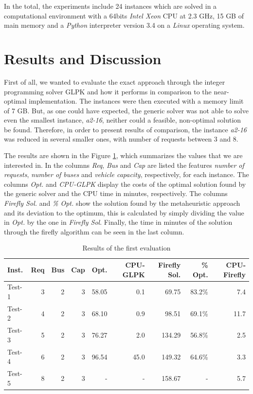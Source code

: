 \documentclass[tuberlin,cic,tc,openright,english,noabntcite,oneside]{iiufrgs}
\begin{document}
In the total, the experiments include 24 instances which are solved in a computational environment with a 64bits \emph{Intel Xeon} CPU at 2.3 GHz, 15 GB of main memory and a \emph{Python} interpreter version 3.4 on a \emph{Linux} operating system.

\section{Results and Discussion}
First of all, we wanted to evaluate the exact approach through the integer programming solver GLPK and how it performs in comparison to the near-optimal implementation. The instances were then executed with a memory limit of 7 GB. But, as one could have expected, the generic solver was not able to solve even the smallest instance, \emph{a2-16}, neither could a feasible, non-optimal solution be found. Therefore, in order to present results of comparison, the instance \emph{a2-16} was reduced in several smaller ones, with number of requests between 3 and 8.

The results are shown in the Figure \ref{tab:evaluation-1}, which summarizes the values that we are interested in. In the columns \emph{Req}, \emph{Bus} and \emph{Cap} are listed the features \emph{number of requests}, \emph{number of buses} and \emph{vehicle capacity}, respectively, for each instance. The columns \emph{Opt.} and \emph{CPU-GLPK} display the costs of the optimal solution found by the generic solver and the CPU time in minutes, respectively. The columns \emph{Firefly Sol.} and \emph{\% Opt.} show the solution found by the metaheuristic approach and its deviation to the optimum, this is calculated by simply dividing the value in \emph{Opt.} by the one in \emph{Firefly Sol}. Finally, the time in minutes of the solution through the firefly algorithm can be seen in the last column.
\begin{table}[H]
\centering
\caption{Results of the first evaluation}
\begin{tabular}{l | r | r | r | r | r | r | r | r}
\hline
Inst. & Req & Bus & Cap & Opt. & CPU-GLPK & Firefly Sol. & \% Opt. & CPU-Firefly\\
\hline
Test-1 & 	3 & 	2 & 	3 & 	58.05 & 	0.1 & 	69.75 & 	83.2\% & 	7.4 \\
Test-2 & 	4 & 	2 & 	3 & 	68.10 & 	0.9 & 	98.51 & 	69.1\% & 	11.7 \\
Test-3 & 	5 & 	2 & 	3 & 	76.27 & 	2.0 & 	134.29 & 	56.8\% & 	2.5 \\
Test-4 & 	6 & 	2 & 	3 & 	96.54 & 	45.0 & 	149.32 & 	64.6\% & 	3.3 \\
Test-5 & 	8 & 	2 & 	3 & 	- & 	- & 	158.67 & 	- & 	5.7 \\
\hline
\end{tabular}
\label{tab:evaluation-1}
\end{table}
\end{document}
